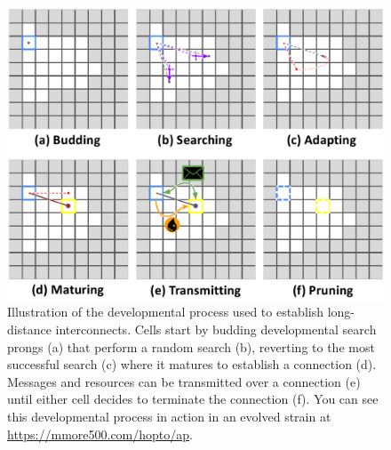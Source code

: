 \fi





\begin{figure}[!htbp]
\begin{center}
\includegraphics[width=1.0\linewidth]{img/spiker-diagram/spiker-combined.pdf}
\caption{
Illustration of the developmental process used to establish long-distance interconnects.  Cells start by budding developmental search prongs (a) that perform a random search (b), reverting to the most successful search (c) where it matures to establish a connection (d).  Messages and resources can be transmitted over a connection (e) until either cell decides to terminate the connection (f).
You can see this developmental process in action in an evolved strain at \url{https://mmore500.com/hopto/ap}.
}
\label{fig:spiker_diagram}
\end{center}
\end{figure}

